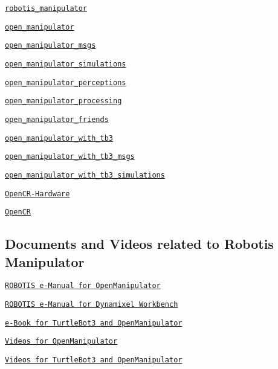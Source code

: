\begin{DoxyItemize}
\item \href{https://github.com/ROBOTIS-GIT/robotis_manipulator}{\tt robotis\+\_\+manipulator}
\item \href{https://github.com/ROBOTIS-GIT/open_manipulator}{\tt open\+\_\+manipulator}
\item \href{https://github.com/ROBOTIS-GIT/open_manipulator_msgs}{\tt open\+\_\+manipulator\+\_\+msgs}
\item \href{https://github.com/ROBOTIS-GIT/open_manipulator_simulations}{\tt open\+\_\+manipulator\+\_\+simulations}
\item \href{https://github.com/ROBOTIS-GIT/open_manipulator_perceptions}{\tt open\+\_\+manipulator\+\_\+perceptions}
\item \href{https://github.com/ROBOTIS-GIT/open_manipulator_processing}{\tt open\+\_\+manipulator\+\_\+processing}
\item \href{https://github.com/ROBOTIS-GIT/open_manipulator_friends}{\tt open\+\_\+manipulator\+\_\+friends}
\item \href{https://github.com/ROBOTIS-GIT/open_manipulator_with_tb3}{\tt open\+\_\+manipulator\+\_\+with\+\_\+tb3}
\item \href{https://github.com/ROBOTIS-GIT/open_manipulator_with_tb3_msgs}{\tt open\+\_\+manipulator\+\_\+with\+\_\+tb3\+\_\+msgs}
\item \href{https://github.com/ROBOTIS-GIT/open_manipulator_with_tb3_simulations}{\tt open\+\_\+manipulator\+\_\+with\+\_\+tb3\+\_\+simulations}
\item \href{https://github.com/ROBOTIS-GIT/OpenCR-Hardware}{\tt Open\+C\+R-\/\+Hardware}
\item \href{https://github.com/ROBOTIS-GIT/OpenCR}{\tt Open\+CR}
\end{DoxyItemize}

\subsection*{Documents and Videos related to Robotis Manipulator}


\begin{DoxyItemize}
\item \href{http://emanual.robotis.com/docs/en/platform/openmanipulator/}{\tt R\+O\+B\+O\+T\+IS e-\/\+Manual for Open\+Manipulator}
\item \href{http://emanual.robotis.com/docs/en/software/dynamixel/dynamixel_workbench/}{\tt R\+O\+B\+O\+T\+IS e-\/\+Manual for Dynamixel Workbench}
\item \href{https://community.robotsource.org/t/download-the-ros-robot-programming-book-for-free/51/}{\tt e-\/\+Book for Turtle\+Bot3 and Open\+Manipulator}
\item \href{https://www.youtube.com/playlist?list=PLRG6WP3c31_WpEsB6_Rdt3KhiopXQlUkb}{\tt Videos for Open\+Manipulator}
\item \href{https://www.youtube.com/playlist?list=PLRG6WP3c31_XI3wlvHlx2Mp8BYqgqDURU}{\tt Videos for Turtle\+Bot3 and Open\+Manipulator} 
\end{DoxyItemize}